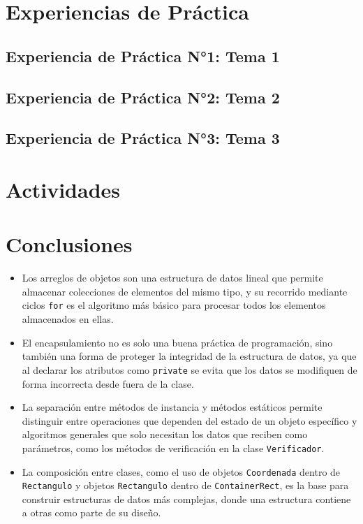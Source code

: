\documentclass[12pt]{article}
\begin{document}
\newpage
\section{Experiencias de Práctica}
\subsection{Experiencia de Práctica N°1: Tema 1}
\subsection{Experiencia de Práctica N°2: Tema 2}
\subsection{Experiencia de Práctica N°3: Tema 3}


\newpage
\section{Actividades}


\newpage
\section{Conclusiones}
\begin{itemize}

    \item Los arreglos de objetos son una estructura de datos 
    lineal que permite almacenar colecciones de elementos del 
    mismo tipo, y su recorrido mediante ciclos \texttt{for} 
    es el algoritmo más básico para procesar todos los 
    elementos almacenados en ellas.

    \item El encapsulamiento no es solo una buena práctica de 
    programación, sino también una forma de proteger la 
    integridad de la estructura de datos, ya que al declarar 
    los atributos como \texttt{private} se evita que los datos 
    se modifiquen de forma incorrecta desde fuera de la clase.

    \item La separación entre métodos de instancia y métodos 
    estáticos permite distinguir entre operaciones que dependen 
    del estado de un objeto específico y algoritmos generales 
    que solo necesitan los datos que reciben como parámetros, 
    como los métodos de verificación en la clase 
    \texttt{Verificador}.

    \item La composición entre clases, como el uso de objetos 
    \texttt{Coordenada} dentro de \texttt{Rectangulo} y 
    objetos \texttt{Rectangulo} dentro de 
    \texttt{ContainerRect}, es la base para construir 
    estructuras de datos más complejas, donde una estructura 
    contiene a otras como parte de su diseño.
\end{itemize}
\end{document}
